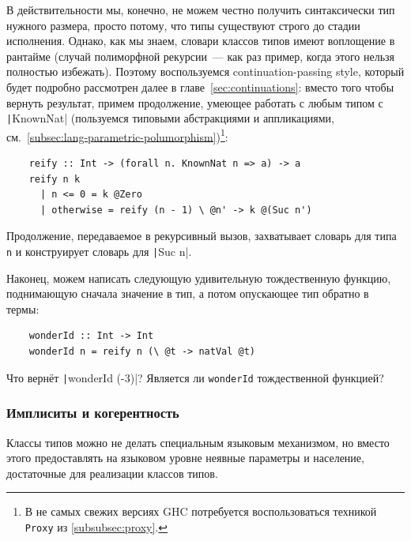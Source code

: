 В действительности мы, конечно, не можем честно получить синтаксически тип нужного размера, просто потому, что типы существуют строго до стадии исполнения.
Однако, как мы знаем, словари классов типов имеют воплощение в рантайме (случай полиморфной рекурсии~--- как раз пример, когда этого нельзя полностью избежать).
Поэтому воспользуемся continuation-passing style, который будет подробно рассмотрен далее в главе~\ref{sec:continuations}: вместо того чтобы вернуть результат, примем продолжение, умеющее работать с любым типом с \texttt|KnownNat| (пользуемся типовыми абстракциями и аппликациями, см.~\ref{subsec:lang-parametric-polumorphism})\footnote{В не самых свежих версиях GHC потребуется воспользоваться техникой \texttt{Proxy} из \ref{subsubsec:proxy}.}:
\begin{verbatim}
    reify :: Int -> (forall n. KnownNat n => a) -> a
    reify n k
      | n <= 0 = k @Zero
      | otherwise = reify (n - 1) \ @n' -> k @(Suc n')
\end{verbatim}

Продолжение, передаваемое в рекурсивный вызов, захватывает словарь для типа \texttt{n} и конструирует словарь для \texttt|Suc n|.

Наконец, можем написать следующую удивительную тождественную функцию, поднимающую сначала значение в тип, а потом опускающее тип обратно в термы:
\begin{verbatim}
    wonderId :: Int -> Int
    wonderId n = reify n (\ @t -> natVal @t)
\end{verbatim}

\begin{task}
    Что вернёт \texttt|wonderId (-3)|?
    Является ли \texttt{wonderId} тождественной функцией?
\end{task}

\subsubsection{Имплиситы и когерентность}

Классы типов можно не делать специальным языковым механизмом, но вместо этого предоставлять на языковом уровне неявные параметры и население, достаточные для реализации классов типов.

